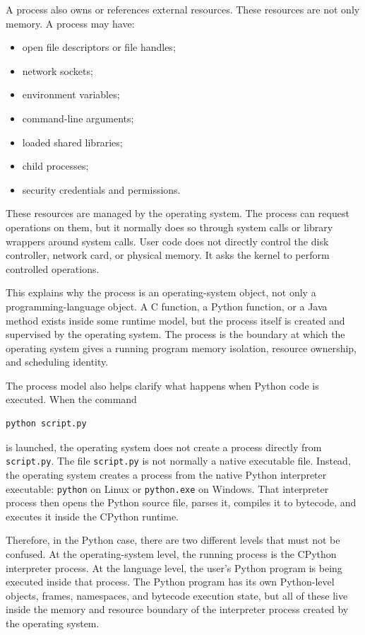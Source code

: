\documentclass[a4paper,twoside]{report}
\begin{document}
A process also owns or references external resources. These resources are not only memory. A process may have:

\begin{itemize}
    \item open file descriptors or file handles;
    \item network sockets;
    \item environment variables;
    \item command-line arguments;
    \item loaded shared libraries;
    \item child processes;
    \item security credentials and permissions.
\end{itemize}

These resources are managed by the operating system. The process can request operations on them, but it normally does so through system calls or library wrappers around system calls. User code does not directly control the disk controller, network card, or physical memory. It asks the kernel to perform controlled operations.

This explains why the process is an operating-system object, not only a programming-language object. A C function, a Python function, or a Java method exists inside some runtime model, but the process itself is created and supervised by the operating system. The process is the boundary at which the operating system gives a running program memory isolation, resource ownership, and scheduling identity.

The process model also helps clarify what happens when Python code is executed. When the command

\begin{verbatim}
python script.py
\end{verbatim}

is launched, the operating system does not create a process directly from \texttt{script.py}. The file \texttt{script.py} is not normally a native executable file. Instead, the operating system creates a process from the native Python interpreter executable: \texttt{python} on Linux or \texttt{python.exe} on Windows. That interpreter process then opens the Python source file, parses it, compiles it to bytecode, and executes it inside the CPython runtime.

Therefore, in the Python case, there are two different levels that must not be confused. At the operating-system level, the running process is the CPython interpreter process. At the language level, the user's Python program is being executed inside that process. The Python program has its own Python-level objects, frames, namespaces, and bytecode execution state, but all of these live inside the memory and resource boundary of the interpreter process created by the operating system.
\end{document}
